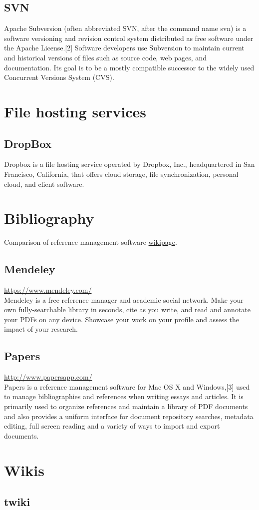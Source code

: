 \documentclass{article}
\begin{document}
\subsection{SVN}
Apache Subversion (often abbreviated SVN, after the command name svn) is a software versioning and revision control system distributed as free software under the Apache License.[2] Software developers use Subversion to maintain current and historical versions of files such as source code, web pages, and documentation. Its goal is to be a mostly compatible successor to the widely used Concurrent Versions System (CVS).

\section{File hosting services}
\subsection{DropBox}
Dropbox is a file hosting service operated by Dropbox, Inc., headquartered in San Francisco, California, that offers cloud storage, file synchronization, personal cloud, and client software.

\section{Bibliography}
Comparison of reference management software \href{https://en.wikipedia.org/wiki/Comparison_of_reference_management_software}{wikipage}. 

\subsection{Mendeley}
\href{https://www.mendeley.com/}{https://www.mendeley.com/}\\
Mendeley is a free reference manager and academic social network. Make your own fully-searchable library in seconds, cite as you write, and read and annotate your PDFs on any device. Showcase your work on your profile and assess the impact of your research. 

\subsection{Papers}
\href{http://www.papersapp.com/}{http://www.papersapp.com/}\\
Papers is a reference management software for Mac OS X and Windows,[3] used to manage bibliographies and references when writing essays and articles. It is primarily used to organize references and maintain a library of PDF documents and also provides a uniform interface for document repository searches, metadata editing, full screen reading and a variety of ways to import and export documents.



\section{Wikis}
\subsection{twiki}
\end{document}
